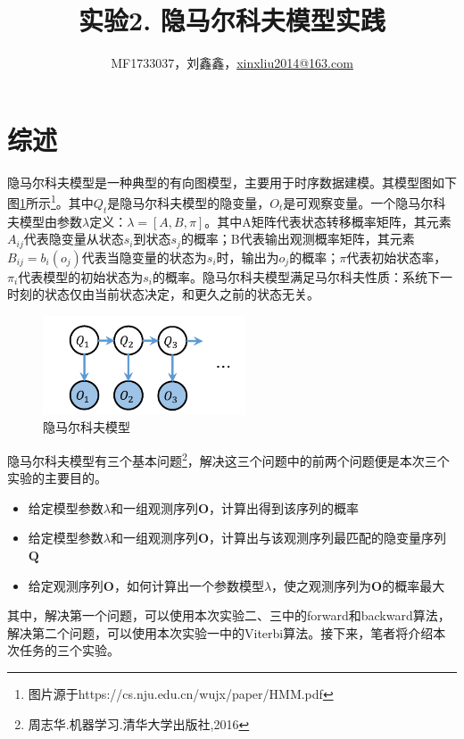 \documentclass[a4paper,UTF8]{article}
\theoremstyle{definition}
\begin{document}
\title{实验2. 隐马尔科夫模型实践}
\author{MF1733037，刘鑫鑫，\url{xinxliu2014@163.com}}
\maketitle

\section*{综述}
隐马尔科夫模型是一种典型的有向图模型，主要用于时序数据建模。其模型图如下图\ref{fig-1}所示\footnote{图片源于https://cs.nju.edu.cn/wujx/paper/HMM.pdf}。其中$Q_t$是隐马尔科夫模型的隐变量，$O_t$是可观察变量。一个隐马尔科夫模型由参数$\lambda$定义：$\lambda=[A,B,\pi]$。其中A矩阵代表状态转移概率矩阵，其元素$A_{ij}$代表隐变量从状态$s_i$到状态$s_j$的概率；B代表输出观测概率矩阵，其元素$B_{ij} = b_i(o_j)$代表当隐变量的状态为$s_i$时，输出为$o_j$的概率；$\pi$代表初始状态率，$\pi_i$代表模型的初始状态为$s_i$的概率。隐马尔科夫模型满足马尔科夫性质：系统下一时刻的状态仅由当前状态决定，和更久之前的状态无关。
\begin{figure}[htbp]
\centering
\includegraphics[width=6cm]{1.png}
\caption{隐马尔科夫模型}
\label{fig-1}
\end{figure}

隐马尔科夫模型有三个基本问题\footnote{周志华.机器学习.清华大学出版社,2016}，解决这三个问题中的前两个问题便是本次三个实验的主要目的。
\begin{itemize}
\item 给定模型参数$\lambda$和一组观测序列$\bm O$，计算出得到该序列的概率
\item 给定模型参数$\lambda$和一组观测序列$\bm O$，计算出与该观测序列最匹配的隐变量序列$\bm Q$
\item 给定观测序列$\bm O$，如何计算出一个参数模型$\lambda$，使之观测序列为$\bm O$的概率最大

\end{itemize}
其中，解决第一个问题，可以使用本次实验二、三中的forward和backward算法，解决第二个问题，可以使用本次实验一中的Viterbi算法。接下来，笔者将介绍本次任务的三个实验。
\end{document}

